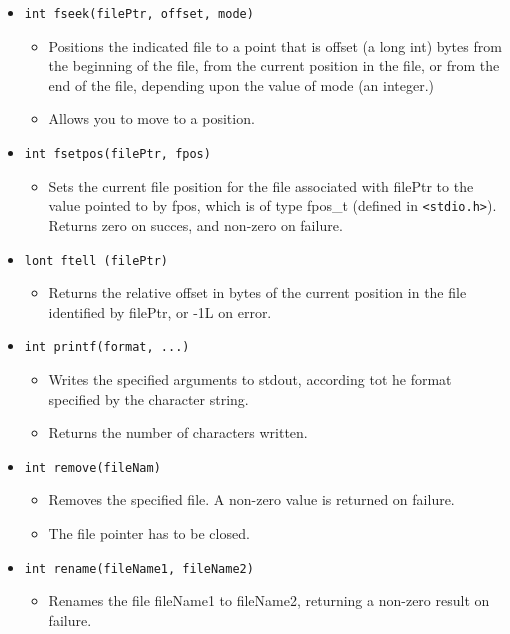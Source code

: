 \begin{itemize}
    \item \texttt{int fseek(filePtr, offset, mode)}
        \begin{itemize}
            \item Positions the indicated file to a point that is offset (a long int) bytes from the beginning of the file, from the current position in the file, or from the end of the file, depending upon the value of mode (an integer.)
            \item Allows you to move to a position. 
        \end{itemize}
    
    \item \texttt{int fsetpos(filePtr, fpos)}
        \begin{itemize}
            \item Sets the current file position for the file associated with filePtr to the value pointed to by fpos, which is of type fpos\_t (defined in \verb|<stdio.h>|). Returns zero on succes, and non-zero on failure.
        \end{itemize}
    
    \item \texttt{lont ftell (filePtr)}
        \begin{itemize}
            \item Returns the relative offset in bytes of the current position in the file identified by filePtr, or -1L on error.
        \end{itemize}
    
    \item \texttt{int printf(format, ...)}
        \begin{itemize}
            \item Writes the specified arguments to stdout, according tot he format specified by the character string. 
            \item Returns the number of characters written. 
        \end{itemize}
    
    \item \texttt{int remove(fileNam)}
        \begin{itemize}
            \item Removes the specified file. A non-zero value is returned on failure.
            \item The file pointer has to be closed. 
        \end{itemize}
    
    \item \texttt{int rename(fileName1, fileName2)}
        \begin{itemize}
            \item Renames the file fileName1 to fileName2, returning a non-zero result on failure.
        \end{itemize}
    

\end{itemize}
